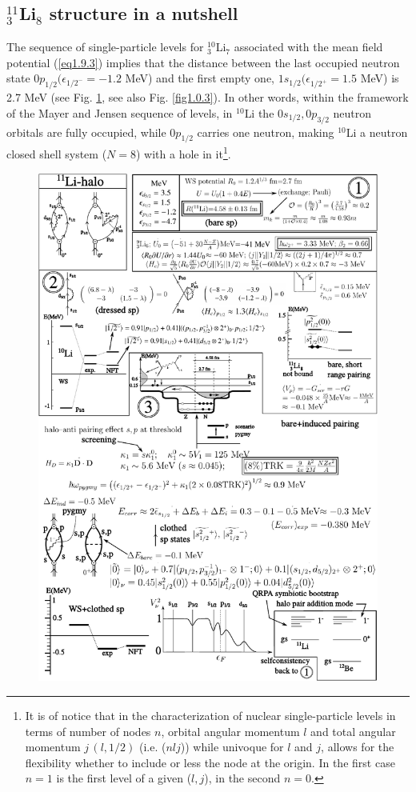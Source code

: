 \subsection{$^{11}_3$Li$_8$ structure in a nutshell}\label{S1.9.3}
The sequence of single-particle levels for  $^{10}_3$Li$_7$ associated with the mean field potential (\ref{eq1.9.3}) implies that the distance between the last occupied neutron state $0p_{1/2}(\epsilon_{1/2^-}=-1.2$ MeV) and  the first empty one, $1s_{1/2}(\epsilon_{1/2^+}=1.5$ MeV) is 2.7 MeV (see Fig. \ref{fig1.9.1}, see also Fig. \ref{fig1.0.3}). In other words, within the framework of the Mayer and Jensen sequence of levels, in $^{10}$Li the $0s_{1/2},0p_{3/2}$ neutron orbitals are fully occupied, while $0p_{1/2}$ carries one neutron, making $^{10}$Li a neutron closed shell system ($N=8$) with a hole in it\footnote{\label{f116C2} It is of notice that in the characterization of nuclear single-particle levels in terms of number of nodes $n$, orbital angular momentum $l$ and total angular momentum $j\,(l,1/2)$ (i.e. ($nlj$)) while univoque for $l$ and $j$, allows for the flexibility whether to include or less the node at the origin. In the first case $n=1$ is the first level of a given ($l,j$), in the second $n=0$.}.
     \begin{figure}
     \centerline {
     \includegraphics*[width=16cm]{introduccion/figs/fig1_9_1}
     }
     \caption{}
     \label{fig1.9.1}
     \end{figure}
 

